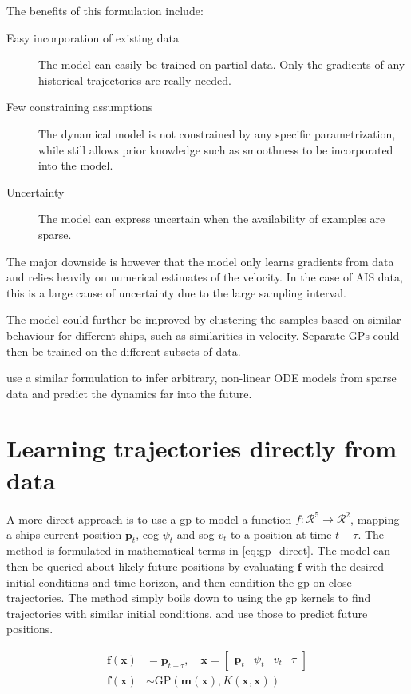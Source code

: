 The benefits of this formulation include:
\begin{description}
    \item[Easy incorporation of existing data] The model can easily be trained on partial data. Only the gradients of any historical trajectories are really needed.
    \item[Few constraining assumptions] The dynamical model is not constrained by any specific parametrization, while still allows prior knowledge such as smoothness to be incorporated into the model.
    \item[Uncertainty] The model can express uncertain when the availability of examples are sparse. 
\end{description}

The major downside is however that the model only learns gradients from data and relies heavily on numerical estimates of the velocity. In the case of AIS data, this is a large cause of uncertainty due to the large sampling interval.

The model could further be improved by clustering the samples based on similar behaviour for different ships, such as similarities in velocity. Separate \acrshort{GP}s could then be trained on the different subsets of data.

\cite{heinonen2018learningode} use a similar formulation to infer arbitrary, non-linear ODE models from sparse data and predict the dynamics far into the future. 



\section{Learning trajectories directly from data}
A more direct approach is to use a \acrshort{gp} to model a function $f: \mathcal{R}^5 \to \mathcal{R}^2$, mapping a ships current position $\boldsymbol{p}_t$, \acrshort{cog} $\psi_t$ and \acrshort{sog} $v_t$ to a position at time $t+\tau$. The method is formulated in mathematical terms in \cref{eq:gp_direct}. The model can then be queried about likely future positions by evaluating $\boldsymbol{f}$ with the desired initial conditions and time horizon, and then condition the \acrshort{gp} on close trajectories. 
The method simply boils down to using the \acrshort{gp} kernels to find trajectories with similar initial conditions, and use those to predict future positions.

\begin{subequations}\label{eq:gp_direct}
\begin{align}
    \boldsymbol{f}(\boldsymbol{x}) &= \boldsymbol{p}_{t+\tau} \label{eq:gp_direct_f}, \quad \boldsymbol{x} = \begin{bmatrix} \boldsymbol{p}_t & \psi_t & v_t & \tau\end{bmatrix}\\
    \boldsymbol{f}(\boldsymbol{x}) &\sim \text{GP}(\boldsymbol{m}(\boldsymbol{x}), K(\boldsymbol{x}, \boldsymbol{x}))\label{eq:gp_direct_f_dist}
\end{align} 
\end{subequations}

